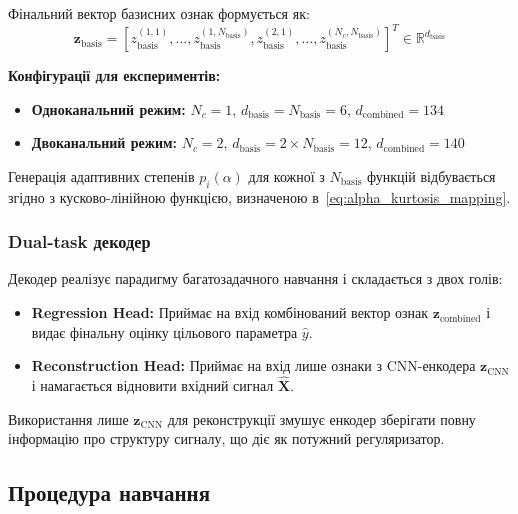 \documentclass[12pt,a4paper]{article}
\begin{document}
Фінальний вектор базисних ознак формується як:
\begin{equation}
	\mathbf{z}_{\text{basis}} = [z_{\text{basis}}^{(1,1)}, \ldots, z_{\text{basis}}^{(1,N_{\text{basis}})}, z_{\text{basis}}^{(2,1)}, \ldots, z_{\text{basis}}^{(N_c,N_{\text{basis}})}]^T \in \mathbb{R}^{d_{\text{basis}}}
\end{equation}

\textbf{Конфігурації для експериментів:}
\begin{itemize}
	\item \textbf{Одноканальний режим:} $N_c = 1$, $d_{\text{basis}} = N_{\text{basis}} = 6$, $d_{\text{combined}} = 134$
	\item \textbf{Двоканальний режим:} $N_c = 2$, $d_{\text{basis}} = 2 \times N_{\text{basis}} = 12$, $d_{\text{combined}} = 140$
\end{itemize}

Генерація адаптивних степенів $p_i(\alpha)$ для кожної з $N_{\text{basis}}$ функцій відбувається згідно з кусково-лінійною функцією, визначеною в~\eqref{eq:alpha_kurtosis_mapping}.

\subsubsection{Dual-task декодер}
Декодер реалізує парадигму багатозадачного навчання і складається з двох голів:
\begin{itemize}
	\item \textbf{Regression Head:} Приймає на вхід комбінований вектор ознак $\mathbf{z}_{\text{combined}}$ і видає фінальну оцінку цільового параметра $\hat{y}$.
	\item \textbf{Reconstruction Head:} Приймає на вхід лише ознаки з CNN-енкодера $\mathbf{z}_{\text{CNN}}$ і намагається відновити вхідний сигнал $\hat{\mathbf{X}}$.
\end{itemize}
Використання лише $\mathbf{z}_{\text{CNN}}$ для реконструкції змушує енкодер зберігати повну інформацію про структуру сигналу, що діє як потужний регуляризатор.

\subsection{Процедура навчання}
\label{sec:training_procedure}
\end{document}
